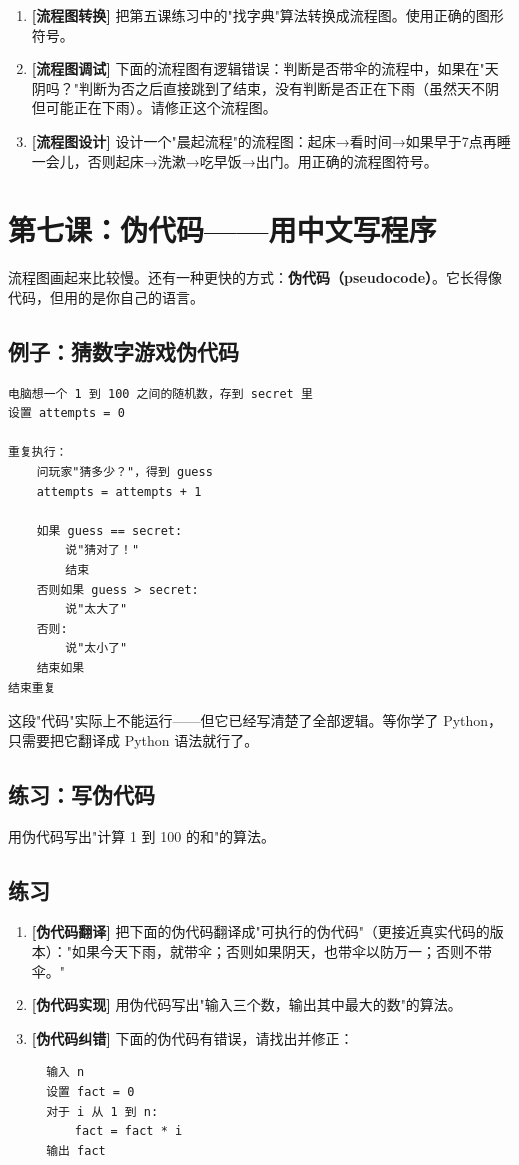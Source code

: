 \documentclass[a4paper,12pt]{ctexart}
\begin{document}
\begin{enumerate}
  \item \textbf{[流程图转换]} 把第五课练习中的"找字典"算法转换成流程图。使用正确的图形符号。
  \item \textbf{[流程图调试]} 下面的流程图有逻辑错误：判断是否带伞的流程中，如果在"天阴吗？"判断为否之后直接跳到了结束，没有判断是否正在下雨（虽然天不阴但可能正在下雨）。请修正这个流程图。
  \item \textbf{[流程图设计]} 设计一个"晨起流程"的流程图：起床→看时间→如果早于7点再睡一会儿，否则起床→洗漱→吃早饭→出门。用正确的流程图符号。
\end{enumerate}

\section*{第七课：伪代码——用中文写程序}

流程图画起来比较慢。还有一种更快的方式：\textbf{伪代码（pseudocode）}。它长得像代码，但用的是你自己的语言。

\subsection*{例子：猜数字游戏伪代码}

\begin{verbatim}
电脑想一个 1 到 100 之间的随机数，存到 secret 里
设置 attempts = 0

重复执行：
    问玩家"猜多少？"，得到 guess
    attempts = attempts + 1
    
    如果 guess == secret:
        说"猜对了！"
        结束
    否则如果 guess > secret:
        说"太大了"
    否则:
        说"太小了"
    结束如果
结束重复
\end{verbatim}

这段"代码"实际上不能运行——但它已经写清楚了全部逻辑。等你学了 Python，只需要把它翻译成 Python 语法就行了。

\subsection*{练习：写伪代码}

用伪代码写出"计算 1 到 100 的和"的算法。

\subsection*{练习}

\begin{enumerate}
  \item \textbf{[伪代码翻译]} 把下面的伪代码翻译成"可执行的伪代码"（更接近真实代码的版本）："如果今天下雨，就带伞；否则如果阴天，也带伞以防万一；否则不带伞。"
  \item \textbf{[伪代码实现]} 用伪代码写出"输入三个数，输出其中最大的数"的算法。
  \item \textbf{[伪代码纠错]} 下面的伪代码有错误，请找出并修正：
  \begin{verbatim}
  输入 n
  设置 fact = 0
  对于 i 从 1 到 n:
      fact = fact * i
  输出 fact
  \end{verbatim}
\end{enumerate}
\end{document}
